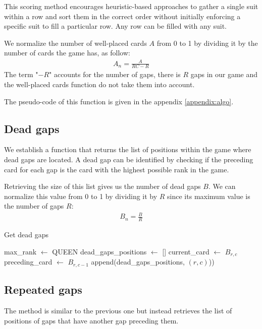 This scoring method encourages heuristic-based approaches to gather a single suit within a row and sort them in the correct order without initially enforcing a specific suit to fill a particular row. Any row can be filled with any suit.

We normalize the number of well-placed cards $A$ from 0 to 1 by dividing it by the number of cards the game has, as follow:
\begin{align}
A_n = \frac{A}{RC-R}
\end{align}
The term "$-R$" accounts for the number of gaps, there is $R$ gaps in our game and the well-placed cards function do not take them into account.

The pseudo-code of this function is given in the appendix \ref{appendix:algo}.


\subsection{Dead gaps}
We establish a function that returns the list of positions within the game where dead gaps are located. A dead gap can be identified by checking if the preceding card for each gap is the card with the highest possible rank in the game.

Retrieving the size of this list gives us the number of dead gaps $B$. We can normalize this value from 0 to 1 by dividing it by $R$ since its maximum value is the number of gaps $R$:
\begin{align}
    B_n = \frac{B}{R}
\end{align}

\begin{algorithm}[H]
    \caption{Get dead gaps}
    \begin{algorithmic}
        \State max\_rank $\gets$ QUEEN
        \State dead\_gaps\_positions $\gets$ []
                \State current\_card $\gets$ $B_{r,c}$
                \State preceding\_card $\gets$ $B_{r,c - 1}$
                    \State append(dead\_gaps\_positions, $(r,c)$))
                \EndIf
            \EndFor
        \EndFor
    \end{algorithmic}
\end{algorithm}

\subsection{Repeated gaps}
The method is similar to the previous one but instead retrieves the list of positions of gaps that have another gap preceding them.

